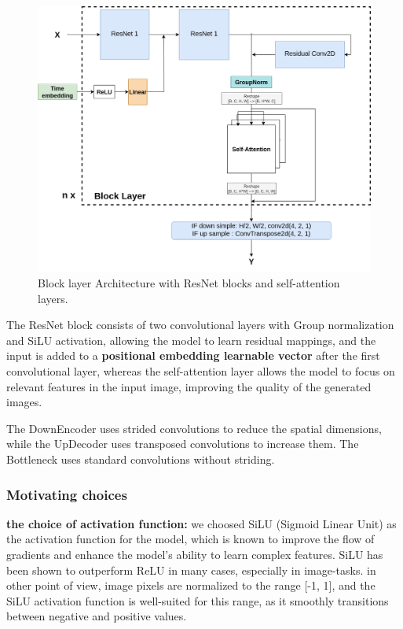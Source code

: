 \documentclass[twocolumn,superscriptaddress,aps]{revtex4-1}
\begin{document}
\begin{figure}[ht]
  \centering
  \includegraphics[width=\textwidth]{figures/block_layer.png}
  \caption{Block layer Architecture with ResNet blocks and self-attention layers.}
  \label{fig:unet_architecture}
\end{figure}

The ResNet block consists of two convolutional layers with Group normalization and SiLU activation, allowing the model to learn residual mappings, and the input is added to a \textbf{positional embedding learnable vector} after the first convolutional layer, whereas the self-attention layer allows the model to focus on relevant features in the input image, improving the quality of the generated images.

The DownEncoder uses strided convolutions to reduce the spatial dimensions, while the UpDecoder uses transposed convolutions to increase them. The Bottleneck uses standard convolutions without striding.


\subsubsection{Motivating choices}

\textbf{the choice of activation function:} we choosed SiLU (Sigmoid Linear Unit) as the activation function for the model, which is known to improve the flow of gradients and enhance the model's ability to learn complex features. SiLU has been shown to outperform ReLU in many cases, especially in image-tasks.
in other point of view, image pixels are normalized to the range [-1, 1], and the SiLU activation function is well-suited for this range, as it smoothly transitions between negative and positive values.
\end{document}
